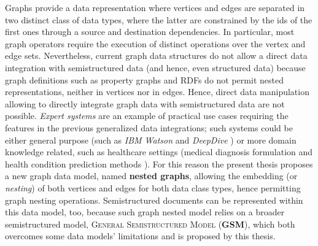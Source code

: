 Graphs provide a data representation where vertices and edges are separated in two distinct class of data types, where the latter are constrained by the ids of the first ones through a source and destination dependencies. In particular, most graph operators require the execution of distinct operations over the vertex and edge sets. Nevertheless, current graph data structures do not allow a direct data integration with semistructured data  \cite{Pentaho,Parra} (and hence, even structured data) because graph definitions such as property graphs and RDFs do not permit nested representations, neither in vertices  nor in edges. Hence, direct data manipulation allowing to directly integrate graph data with semistructured data are not possible.  %
\textit{Expert systems} are an example of practical use cases requiring the features in the previous generalized data integrations; such systems could be either general purpose (such as \textit{IBM Watson} \cite{IBMWatson} and \textit{DeepDive} \cite{PalomaresAKR16}) or more domain knowledge related, such as healthcare settings (medical diagnosis formulation \cite{NestedGlaucoma} and health condition prediction methods \cite{OPLON15}). 
For this reason the present thesis proposes a new graph data model, named \textbf{nested graphs}, allowing the embedding (or \textit{nesting}) of both vertices and edges for both data class types, hence permitting graph nesting operations. Semistructured documents can be represented within this data model, too, because such graph nested model relies on a broader semistructured model, \textsc{General Semistructured Model} (\textbf{GSM}), which both overcomes some  data models' limitations and is proposed by this thesis. 



